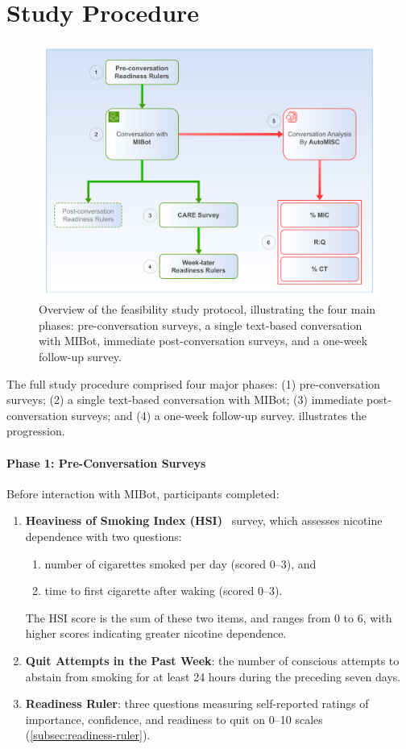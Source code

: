 \section{Study Procedure}
\begin{figure}[ht]
	\centering
	\includegraphics[width=0.9\linewidth]{fig/feasibility_study_flow.pdf}
	\caption[Feasibility Study Protocol Overview]{Overview of the feasibility study protocol, illustrating the four main phases: pre-conversation surveys, a single text-based conversation with MIBot, immediate post-conversation surveys, and a one-week follow-up survey.}
	\label{fig:study-flow}
\end{figure}

The full study procedure comprised four major phases: (1) pre-conversation surveys; (2)
a single text-based conversation with MIBot; (3) immediate post-conversation surveys;
and (4) a one-week follow-up survey.  illustrates the progression.

\paragraph{Phase 1: Pre-Conversation Surveys}
Before interaction with MIBot, participants completed:
\begin{enumerate}
	\item \textbf{Heaviness of Smoking Index (HSI)}~\citep{heatherton1989measuring} survey, which assesses nicotine dependence with two questions:
	      \begin{enumerate}
		      \item number of cigarettes smoked per day (scored 0--3), and
		      \item time to first cigarette after waking (scored 0--3).
	      \end{enumerate}
	      The HSI score is the sum of these two items, and ranges from 0 to 6, with higher scores indicating greater nicotine dependence.
	\item \textbf{Quit Attempts in the Past Week}: the number of conscious attempts to abstain from smoking for at least 24 hours during the preceding seven days.
	\item \textbf{Readiness Ruler}: three questions measuring self-reported ratings of importance, confidence, and readiness to quit on 0--10 scales (\cref{subsec:readiness-ruler}).
\end{enumerate}


